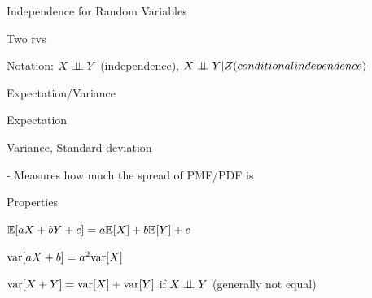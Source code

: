 \documentclass[handout,fleqn,aspectratio=169]{beamer}
\begin{document}
\begin{frame}{Independence for Random Variables}

\bci 
\item<4-> Two rvs

\item Notation: $X \perp \!\!\! \perp Y$ (independence), $X \perp \!\!\! \perp Y | Z (conditional independence)$
\eci 


\end{frame}

\begin{frame}{Expectation/Variance}

{
\plitemsep 0.1in
\bci
\item Expectation

\item Variance, Standard deviation

\vspace{0.3cm}
- Measures how much the spread of PMF/PDF is

\eci
}
{
Properties

\medskip
\bci
\item $\mathbb{E}[ aX + bY +c ] = a\mathbb{E}[ X ] + b\mathbb{E}[ Y ] + c$

\item $\text{var}[ aX +b ] = a^2 \text{var}[ X ]$

\item $\text{var}[ X + Y ] = \text{var}[ X ] + \text{var}[ Y ]$ if $X \perp \!\!\! \perp Y$ (generally not equal)
\eci
}

\end{frame}
\end{document}
